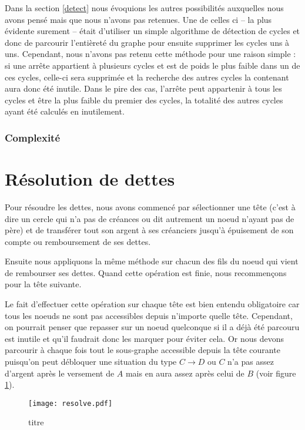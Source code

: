 \documentclass[12pt, oneside]{article}
\begin{document}
Dans la section \ref{detect} nous évoquions les autres possibilités auxquelles nous avons pensé mais que nous n'avons pas retenues. Une de celles ci -- la plus évidente surement -- était d'utiliser un simple algorithme de détection de cycles et donc de parcourir l'entièreté du graphe pour ensuite supprimer les cycles uns à uns. Cependant, nous n'avons pas retenu cette méthode pour une raison simple : si une arrête appartient à plusieurs cycles et est de poids le plus faible dans un de ces cycles, celle-ci sera supprimée et la recherche des autres cycles la contenant aura donc été inutile. Dans le pire des cas, l'arrête peut appartenir à tous les cycles et être la plus faible du premier des cycles, la totalité des autres cycles ayant été calculés en inutilement.


\subsubsection{Complexité}


\section{Résolution de dettes}
Pour résoudre les dettes, nous avons commencé par sélectionner une tête (c'est à dire un cercle qui n'a pas de créances ou dit autrement un noeud n'ayant pas de père) et de transférer tout son argent à ses créanciers jusqu'à épuisement de son compte ou remboursement de ses dettes.

Ensuite nous appliquons la même méthode sur chacun des fils du noeud qui vient de rembourser ses dettes. Quand cette opération est finie, nous recommençons pour la tête suivante.

Le fait d'effectuer cette opération sur chaque tête est bien entendu obligatoire car tous les noeuds ne sont pas accessibles depuis n'importe quelle tête. Cependant, on pourrait penser que repasser sur un noeud quelconque si il a déjà été parcouru est inutile et qu'il faudrait donc les marquer pour éviter cela. Or nous devons parcourir à chaque fois tout le sous-graphe accessible depuis la tête courante puisqu'on peut débloquer une situation du type $C \rightarrow D$ ou $C$ n'a pas assez d'argent après le versement de $A$ mais en aura assez après celui de $B$ (voir figure \ref{resolve}).

\begin{figure}[h]
   \caption{\label{resolve} titre}
   \begin{center}
   \texttt{[image: resolve.pdf]}
   \end{center}
\end{figure}
\end{document}
